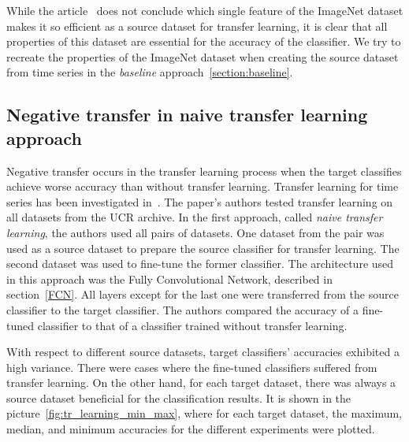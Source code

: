 \documentclass[a4paper,11pt,twoside]{report}
\theoremstyle{definition}
\begin{document}
While the article~\cite{imagnet} does not conclude which single feature of the ImageNet dataset makes it so efficient as a source dataset for transfer learning, it is clear that all properties of this dataset are essential for the accuracy of the classifier. We try to recreate the properties of the ImageNet dataset when creating the source dataset from time series in the \textit{baseline} approach~\ref{section:baseline}.



\subsection{Negative transfer in naive transfer learning approach}\label{Negative_transfer}
Negative transfer occurs in the transfer learning process when the target classifies achieve worse accuracy than without transfer learning. Transfer learning for time series has been investigated in~\cite{transfer_learning_time_series}. The paper's authors tested transfer learning on all datasets from the UCR archive. In the first approach, called \textit{naive transfer learning}, the authors used all pairs of datasets. One dataset from the pair was used as a source dataset to prepare the source classifier for transfer learning. The second dataset was used to fine-tune the former classifier. The architecture used in this approach was the Fully Convolutional Network, described in section~\ref{FCN}. All layers except for the last one were transferred from the source classifier to the target classifier. The authors compared the accuracy of a fine-tuned classifier to that of a classifier trained without transfer learning.

With respect to different source datasets, target classifiers' accuracies exhibited a high variance. There were cases where the fine-tuned classifiers suffered from transfer learning. On the other hand, for each target dataset, there was always a source dataset beneficial for the classification results. It is shown in the picture~\ref{fig:tr_learning_min_max}, where for each target dataset, the maximum, median, and minimum accuracies for the different experiments were plotted.

\FloatBarrier
\end{document}
